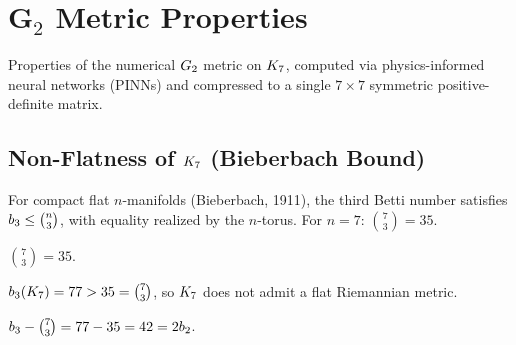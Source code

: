 \chapter{G\texorpdfstring{$_2$}{2} Metric Properties}\label{chap:g2metric}

Properties of the numerical $G_2$ metric on $K_7$, computed via
physics-informed neural networks (PINNs) and compressed to a single
$7 \times 7$ symmetric positive-definite matrix.

\section{Non-Flatness of \texorpdfstring{$K_7$}{K7} (Bieberbach Bound)}

\begin{definition}\label{def:bieberbach_bound}
    \leanok
    For compact flat $n$-manifolds (Bieberbach, 1911), the third Betti number
    satisfies $b_3 \leq \binom{n}{3}$, with equality realized by the $n$-torus.
    For $n = 7$: $\binom{7}{3} = 35$.
\end{definition}

\begin{theorem}\label{thm:bieberbach_binomial}
    \leanok
    $\binom{7}{3} = 35$.
\end{theorem}

\begin{theorem}\label{thm:K7_nonflatness}
    \leanok
    $b_3(K_7) = 77 > 35 = \binom{7}{3}$, so $K_7$ does not admit
    a flat Riemannian metric.
\end{theorem}

\begin{theorem}\label{thm:bieberbach_gap}
    \leanok
    $b_3 - \binom{7}{3} = 77 - 35 = 42 = 2b_2$.
\end{theorem}

